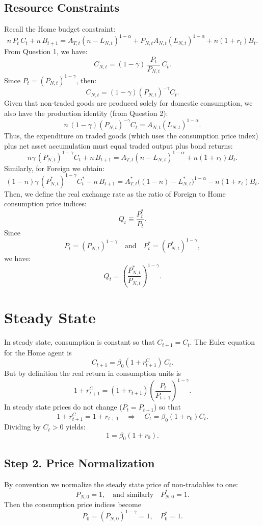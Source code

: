 \documentclass[a4paper,12pt]{article} %
\theoremstyle{nonitalic}
\begin{document}
\subsection*{Resource Constraints}
Recall the Home budget constraint:
\[
n\,P_t\,C_t + n\,B_{t+1} = A_{T,t}(n-L_{N,t})^{1-\alpha} + P_{N,t}A_{N,t}(L_{N,t})^{1-\alpha} + n(1+r_t)B_t.
\]
From Question 1, we have:
\[
C_{N,t} = (1-\gamma)\,\frac{P_t}{P_{N,t}}\,C_t.
\]
Since \(P_t=(P_{N,t})^{1-\gamma}\), then:
\[
C_{N,t} = (1-\gamma)(P_{N,t})^{-\gamma}C_t.
\]
Given that non-traded goods are produced solely for domestic consumption, we also have the production identity (from Question 2):
\[
n\,(1-\gamma)(P_{N,t})^{-\gamma}C_t = A_{N,t}(L_{N,t})^{1-\alpha}.
\]
Thus, the expenditure on traded goods (which uses the consumption price index) plus net asset accumulation must equal traded output plus bond returns:
\[
\boxed{n\gamma\,(P_{N,t})^{1-\gamma}C_t + n\,B_{t+1} = A_{T,t}(n-L_{N,t})^{1-\alpha} + n(1+r_t)B_t.}
\]
Similarly, for Foreign we obtain:
\[
\boxed{(1-n)\gamma\,(P^*_{N,t})^{1-\gamma}C^*_t - n\,B_{t+1} = A^*_{T,t}\big((1-n)-L^*_{N,t}\big)^{1-\alpha} - n(1+r_t)B_t.}
\]
Then, we define the real exchange rate as the ratio of Foreign to Home consumption price indices:
\[
Q_t \equiv \frac{P^*_t}{P_t}.
\]
Since
\[
P_t = (P_{N,t})^{1-\gamma} \quad \text{and} \quad P^*_t = (P^*_{N,t})^{1-\gamma},
\]
we have:
\[
\boxed{Q_t = \left(\frac{P^*_{N,t}}{P_{N,t}}\right)^{1-\gamma}.}
\]

\section{Steady State}

In steady state, consumption is constant so that $C_{t+1}=C_t$. The Euler equation for the Home agent is
\[
C_{t+1} = \beta_0(1+r_{t+1}^C)\,C_t.
\]
But by definition the real return in consumption units is
\[
1+r_{t+1}^C = (1+r_{t+1})\left(\frac{P_t}{P_{t+1}}\right)^{1-\gamma}.
\]
In steady state prices do not change ($P_t=P_{t+1}$) so that
\[
1+r_{t+1}^C = 1+r_{t+1}\quad\Rightarrow\quad C_t = \beta_0(1+r_0)C_t.
\]
Dividing by $C_t>0$ yields:
\[
1=\beta_0(1+r_0).
\]

\subsection*{Step 2. Price Normalization}
By convention we normalize the steady state price of non-tradables to one:
\[
P_{N,0}=1,\quad \text{and similarly}\quad P^*_{N,0}=1.
\]
Then the consumption price indices become
\[
P_0=(P_{N,0})^{1-\gamma}=1,\quad P^*_0=1.
\]
\end{document}
